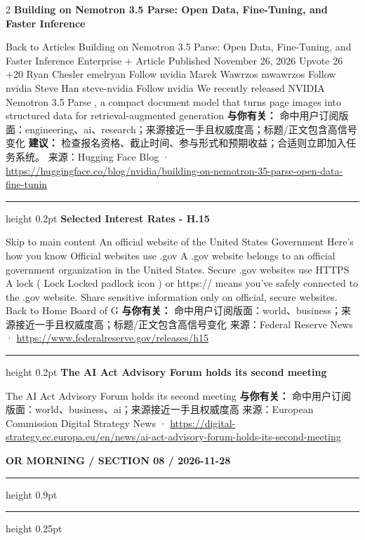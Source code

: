 \documentclass[10.5pt]{ctexart}
\begin{document}
\begin{multicols}{2}
{\large\bfseries Building on Nemotron 3.5 Parse: Open Data, Fine-Tuning, and Faster Inference}\par
Back to Articles Building on Nemotron 3.5 Parse: Open Data, Fine-Tuning, and Faster Inference Enterprise + Article Published November 26, 2026 Upvote 26 +20 Ryan Chesler emelryan Follow nvidia Marek Wawrzos mwawrzos Follow nvidia Steve Han steve-nvidia Follow nvidia We recently released NVIDIA Nemotron 3.5 Parse , a compact document model that turns page images into structured data for retrieval-augmented generation 
\textbf{与你有关：} 命中用户订阅版面：engineering、ai、research；来源接近一手且权威度高；标题/正文包含高信号变化
\textbf{建议：} 检查报名资格、截止时间、参与形式和预期收益；合适则立即加入任务系统。
{\footnotesize\color{ormuted} 来源：Hugging Face Blog · \url{https://huggingface.co/blog/nvidia/building-on-nemotron-35-parse-open-data-fine-tunin}}
\vspace{2mm}
\hrule height 0.2pt
\vspace{2mm}
{\large\bfseries Selected Interest Rates - H.15}\par
Skip to main content An official website of the United States Government Here's how you know Official websites use .gov A .gov website belongs to an official government organization in the United States. Secure .gov websites use HTTPS A lock ( Lock Locked padlock icon ) or https:// means you've safely connected to the .gov website. Share sensitive information only on official, secure websites. Back to Home Board of G
\textbf{与你有关：} 命中用户订阅版面：world、business；来源接近一手且权威度高；标题/正文包含高信号变化
{\footnotesize\color{ormuted} 来源：Federal Reserve News · \url{https://www.federalreserve.gov/releases/h15}}
\vspace{2mm}
\hrule height 0.2pt
\vspace{2mm}
{\large\bfseries The AI Act Advisory Forum holds its second meeting}\par
The AI Act Advisory Forum holds its second meeting
\textbf{与你有关：} 命中用户订阅版面：world、business、ai；来源接近一手且权威度高
{\footnotesize\color{ormuted} 来源：European Commission Digital Strategy News · \url{https://digital-strategy.ec.europa.eu/en/news/ai-act-advisory-forum-holds-its-second-meeting}}
\end{multicols}
\newpage
{\small\bfseries OR MORNING / SECTION 08 / 2026-11-28}
\vspace{2mm}
\hrule height 0.9pt
\vspace{1.5mm}
\hrule height 0.25pt
\vspace{4mm}
\end{document}

